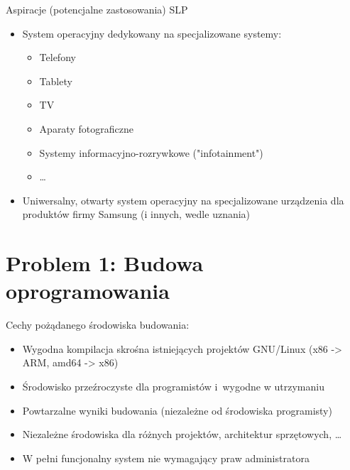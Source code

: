 \documentclass[presentation,aspectratio=43,12pt]{beamer}
\begin{document}
\begin{frame}[label=sec-2-7]{Aspiracje (potencjalne zastosowania) SLP}
\begin{itemize}
\item System operacyjny dedykowany na specjalizowane systemy:
\begin{itemize}
\item Telefony
\item Tablety
\item TV
\item Aparaty fotograficzne
\item Systemy informacyjno-rozrywkowe ("infotainment")
\item \ldots{}
\end{itemize}
\pause

\item Uniwersalny, otwarty system operacyjny na specjalizowane
urządzenia dla produktów firmy Samsung (i innych, wedle uznania)
\end{itemize}

\end{frame}

\section{Problem 1: Budowa oprogramowania}
\label{sec-3}

\begin{frame}[label=sec-3-1]{Cechy pożądanego środowiska budowania:}
\begin{itemize}
\item Wygodna kompilacja skrośna istniejących projektów GNU/Linux (x86
-> ARM, amd64 -> x86)

\item Środowisko przeźroczyste dla programistów i~wygodne w utrzymaniu

\item Powtarzalne wyniki budowania (niezależne od środowiska
programisty)
\end{itemize}


\begin{itemize}
\item <2-> Niezależne środowiska dla różnych projektów, architektur sprzętowych, \ldots{}

\item <2-> W pełni funcjonalny system nie wymagający praw administratora
\end{itemize}

\end{frame}
\end{document}
